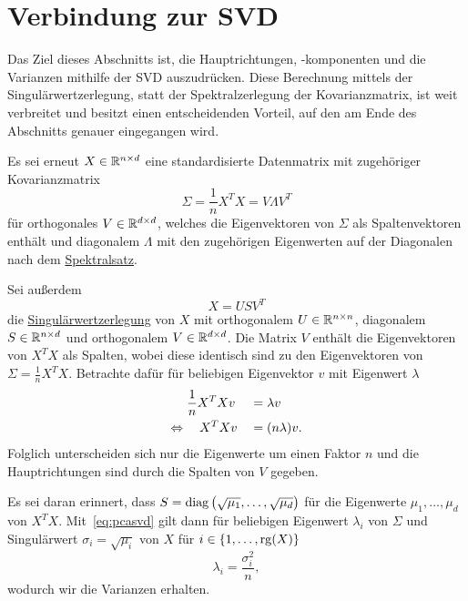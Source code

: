 \section{Verbindung zur SVD}

Das Ziel dieses Abschnitts ist, die Hauptrichtungen, -komponenten und die Varianzen mithilfe der SVD auszudrücken.
Diese Berechnung mittels der Singulärwertzerlegung, statt der Spektralzerlegung der Kovarianzmatrix, ist weit verbreitet und besitzt einen entscheidenden Vorteil, auf den am Ende des Abschnitts genauer eingegangen wird.

Es sei erneut \(X \in \mathbb{R}^{n \times d}\) eine standardisierte Datenmatrix mit zugehöriger Kovarianzmatrix
\begin{equation*}
    \Sigma = \frac{1}{n}X^{T}X = V\Lambda V^{T}
\end{equation*}  
für orthogonales \(V \in \mathbb{R}^{d \times d}\), welches die Eigenvektoren von \(\Sigma\) als Spaltenvektoren enthält und diagonalem \(\Lambda\) mit den zugehörigen Eigenwerten auf der Diagonalen nach dem \hyperref[spec]{Spektralsatz}.

Sei außerdem
\begin{equation*}
    X = USV^{T}
\end{equation*}
die \hyperref[th:svd]{Singulärwertzerlegung} von \(X\) mit orthogonalem \(U \in \mathbb{R}^{n \times n}\), diagonalem \(S \in \mathbb{R}^{n \times d}\) und orthogonalem \(V \in \mathbb{R}^{d \times d}\).
Die Matrix \(V\) enthält die Eigenvektoren von \(X^{T}X\) als Spalten, wobei diese identisch sind zu den Eigenvektoren von \(\Sigma = \frac{1}{n}X^{T}X\).
Betrachte dafür für beliebigen Eigenvektor \(v\) mit Eigenwert \(\lambda\)
\begin{alignat}{2}
    &\frac{1}{n}X^{T}Xv &{}={}& \lambda v \notag\\
    \Leftrightarrow{}& \quad X^{T}Xv &{}={}&(n\lambda)v \label{eq:pcasvd}.
\end{alignat}      
Folglich unterscheiden sich nur die Eigenwerte um einen Faktor \(n\) und die Hauptrichtungen sind durch die Spalten von \(V\) gegeben. 

Es sei daran erinnert, dass \(S=\operatorname{diag}\left(\sqrt{\mu_{1}},\ldots,\sqrt{\mu_{d}}\right)\) für die Eigenwerte \(\mu_{1},\ldots,\mu_{d}\) von \(X^{T}X\). 
Mit~\eqref{eq:pcasvd} gilt dann für beliebigen Eigenwert \(\lambda_{i}\) von \(\Sigma\) und Singulärwert \(\sigma_{i} = \sqrt{\mu_{i}}\) von \(X\) für \(i \in \{1,\ldots,\operatorname{rg}(X)\}\)
\begin{equation*}
    \lambda_{i} = \frac{\sigma_{i}^{2}}{n},
\end{equation*}
wodurch wir die Varianzen erhalten.

